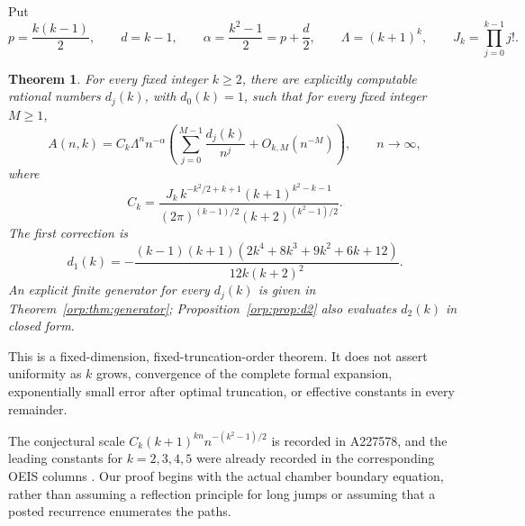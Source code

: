 \documentclass[11pt]{article}
\newtheorem{theorem}{Theorem}[section]
\theoremstyle{remark}\newtheorem{remark}[theorem]{Remark}
\begin{document}
Put
\begin{equation}\label{orp:eq:parameters}
 p=\frac{k(k-1)}2,\qquad d=k-1,\qquad
 \alpha=\frac{k^2-1}2=p+\frac d2,\qquad
 \Lambda=(k+1)^k,\qquad J_k=\prod_{j=0}^{k-1}j!.
\end{equation}
\begin{theorem}\label{orp:thm:main}
For every fixed integer $k\ge2$, there are explicitly computable rational numbers $d_j(k)$, with $d_0(k)=1$, such that for every fixed integer $M\ge1$,
\begin{equation}\label{orp:eq:main}
 A(n,k)=C_k\Lambda^n n^{-\alpha}
 \left(\sum_{j=0}^{M-1}\frac{d_j(k)}{n^j}+O_{k,M}(n^{-M})\right),
 \qquad n\longrightarrow\infty,
\end{equation}
where
\begin{equation}\label{orp:eq:C}
 C_k=\frac{J_k\,k^{-k^2/2+k+1}(k+1)^{k^2-k-1}}
 {(2\pi)^{(k-1)/2}(k+2)^{(k^2-1)/2}}.
\end{equation}
The first correction is
\begin{equation}\label{orp:eq:d1}
 d_1(k)=-\frac{(k-1)(k+1)(2k^4+8k^3+9k^2+6k+12)}{12k(k+2)^2}.
\end{equation}
An explicit finite generator for every $d_j(k)$ is given in Theorem~\ref{orp:thm:generator}; Proposition~\ref{orp:prop:d2} also evaluates $d_2(k)$ in closed form.
\end{theorem}
This is a fixed-dimension, fixed-truncation-order theorem. It does not assert uniformity as $k$ grows, convergence of the complete formal expansion, exponentially small error after optimal truncation, or effective constants in every remainder.

The conjectural scale $C_k(k+1)^{kn}n^{-(k^2-1)/2}$ is recorded in A227578, and the leading constants for $k=2,3,4,5$ were already recorded in the corresponding OEIS columns \cite{oeis,oeis2,oeis3,oeis4,oeis5}. Our proof begins with the actual chamber boundary equation, rather than assuming a reflection principle for long jumps or assuming that a posted recurrence enumerates the paths.
\end{document}
